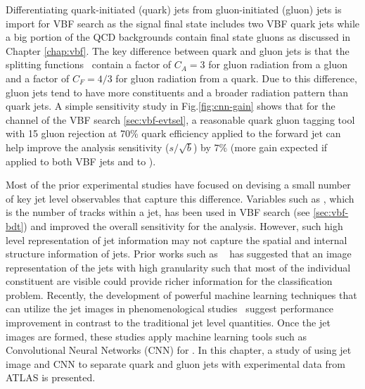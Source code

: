 Differentiating quark-initiated (quark) jets from gluon-initiated (gluon) jets is import for VBF \Hbb search as the signal final state includes two VBF quark jets while a big portion of the QCD backgrounds contain final state gluons as discussed in Chapter \ref{chap:vbf}. The key difference between quark and gluon jets is that the splitting functions~\cite{Altarelli:1977zs} contain a factor of $C_A=3$ for gluon radiation from a gluon and a factor of $C_F=4/3$ for gluon radiation from a quark. Due to this difference, gluon jets tend to have more constituents and a broader radiation pattern than quark jets. A simple sensitivity study in Fig.\ref{fig:cnn-gain} shows that for the \twocentral channel of the VBF \Hbb search \ref{sec:vbf-evtsel}, a reasonable quark gluon tagging tool with 15 gluon rejection at 70\% quark efficiency applied to the forward jet can help improve the analysis sensitivity ($s/\sqrt{b}$) by $7\%$ (more gain expected if applied to both VBF jets and to \fourcentral).

Most of the prior experimental studies have focused on devising a small number of key jet level observables that capture this difference. Variables such as \ntrk, which is the number of tracks within a jet, has been used in VBF \Hbb search (see \ref{sec:vbf-bdt}) and improved the overall sensitivity for the analysis. However, such high level representation of jet information may not capture the spatial and internal structure information of jets. Prior works such as ~\cite{deOliveira:2015xxd} has suggested that an image representation of the jets with high granularity such that most of the individual constituent are visible could provide richer information for the classification problem. Recently, the development of powerful machine learning techniques that can utilize the jet images in phenomenological studies~\cite{Komiske:2016rsd,Dery:2017fap} suggest \qgtagging performance improvement in contrast to the traditional jet level quantities. Once the jet images are formed, these studies apply machine learning tools such as Convolutional Neural Networks (CNN) for \qgtagging. In this chapter, a study of using jet image and CNN to separate quark and gluon jets with experimental data from ATLAS is presented. 


